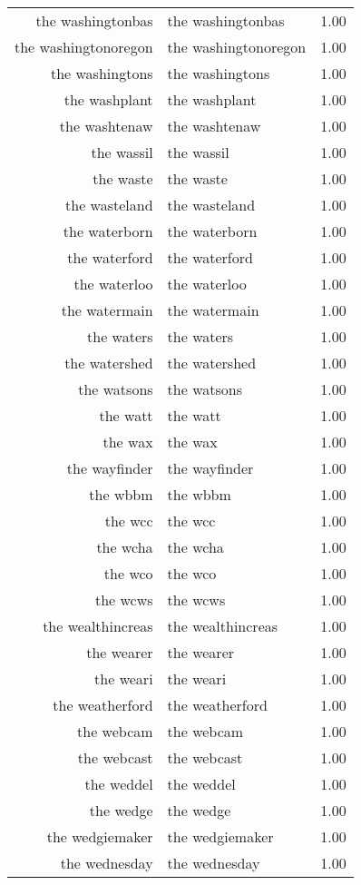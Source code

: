 \begin{table}[ht]
\begin{tabular}{rlr}
  the washingtonbas & the washingtonbas & 1.00 \\ 
  the washingtonoregon & the washingtonoregon & 1.00 \\ 
  the washingtons & the washingtons & 1.00 \\ 
  the washplant & the washplant & 1.00 \\ 
  the washtenaw & the washtenaw & 1.00 \\ 
  the wassil & the wassil & 1.00 \\ 
  the waste & the waste & 1.00 \\ 
  the wasteland & the wasteland & 1.00 \\ 
  the waterborn & the waterborn & 1.00 \\ 
  the waterford & the waterford & 1.00 \\ 
  the waterloo & the waterloo & 1.00 \\ 
  the watermain & the watermain & 1.00 \\ 
  the waters & the waters & 1.00 \\ 
  the watershed & the watershed & 1.00 \\ 
  the watsons & the watsons & 1.00 \\ 
  the watt & the watt & 1.00 \\ 
  the wax & the wax & 1.00 \\ 
  the wayfinder & the wayfinder & 1.00 \\ 
  the wbbm & the wbbm & 1.00 \\ 
  the wcc & the wcc & 1.00 \\ 
  the wcha & the wcha & 1.00 \\ 
  the wco & the wco & 1.00 \\ 
  the wcws & the wcws & 1.00 \\ 
  the wealthincreas & the wealthincreas & 1.00 \\ 
  the wearer & the wearer & 1.00 \\ 
  the weari & the weari & 1.00 \\ 
  the weatherford & the weatherford & 1.00 \\ 
  the webcam & the webcam & 1.00 \\ 
  the webcast & the webcast & 1.00 \\ 
  the weddel & the weddel & 1.00 \\ 
  the wedge & the wedge & 1.00 \\ 
  the wedgiemaker & the wedgiemaker & 1.00 \\ 
  the wednesday & the wednesday & 1.00 \\ 

\end{tabular}
\end{table}

